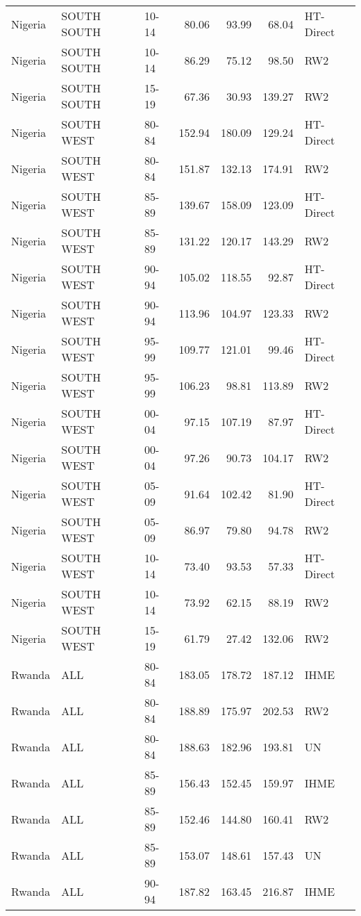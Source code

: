 \begin{longtable}{lllrrrl}
  Nigeria & SOUTH SOUTH & 10-14 & 80.06 & 93.99 & 68.04 & HT-Direct \\ 
  Nigeria & SOUTH SOUTH & 10-14 & 86.29 & 75.12 & 98.50 & RW2 \\ 
  Nigeria & SOUTH SOUTH & 15-19 & 67.36 & 30.93 & 139.27 & RW2 \\ 
  Nigeria & SOUTH WEST & 80-84 & 152.94 & 180.09 & 129.24 & HT-Direct \\ 
  Nigeria & SOUTH WEST & 80-84 & 151.87 & 132.13 & 174.91 & RW2 \\ 
  Nigeria & SOUTH WEST & 85-89 & 139.67 & 158.09 & 123.09 & HT-Direct \\ 
  Nigeria & SOUTH WEST & 85-89 & 131.22 & 120.17 & 143.29 & RW2 \\ 
  Nigeria & SOUTH WEST & 90-94 & 105.02 & 118.55 & 92.87 & HT-Direct \\ 
  Nigeria & SOUTH WEST & 90-94 & 113.96 & 104.97 & 123.33 & RW2 \\ 
  Nigeria & SOUTH WEST & 95-99 & 109.77 & 121.01 & 99.46 & HT-Direct \\ 
  Nigeria & SOUTH WEST & 95-99 & 106.23 & 98.81 & 113.89 & RW2 \\ 
  Nigeria & SOUTH WEST & 00-04 & 97.15 & 107.19 & 87.97 & HT-Direct \\ 
  Nigeria & SOUTH WEST & 00-04 & 97.26 & 90.73 & 104.17 & RW2 \\ 
  Nigeria & SOUTH WEST & 05-09 & 91.64 & 102.42 & 81.90 & HT-Direct \\ 
  Nigeria & SOUTH WEST & 05-09 & 86.97 & 79.80 & 94.78 & RW2 \\ 
  Nigeria & SOUTH WEST & 10-14 & 73.40 & 93.53 & 57.33 & HT-Direct \\ 
  Nigeria & SOUTH WEST & 10-14 & 73.92 & 62.15 & 88.19 & RW2 \\ 
  Nigeria & SOUTH WEST & 15-19 & 61.79 & 27.42 & 132.06 & RW2 \\ 
  Rwanda & ALL & 80-84 & 183.05 & 178.72 & 187.12 & IHME \\ 
  Rwanda & ALL & 80-84 & 188.89 & 175.97 & 202.53 & RW2 \\ 
  Rwanda & ALL & 80-84 & 188.63 & 182.96 & 193.81 & UN \\ 
  Rwanda & ALL & 85-89 & 156.43 & 152.45 & 159.97 & IHME \\ 
  Rwanda & ALL & 85-89 & 152.46 & 144.80 & 160.41 & RW2 \\ 
  Rwanda & ALL & 85-89 & 153.07 & 148.61 & 157.43 & UN \\ 
  Rwanda & ALL & 90-94 & 187.82 & 163.45 & 216.87 & IHME \\ 

\end{longtable}
